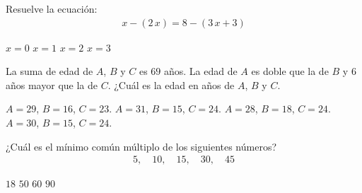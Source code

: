\documentclass[12pt]{exam}
\begin{document}
\begin{multicols}{2}
\begin{questions}
\begin{choices}
    \end{choices}
    \question Resuelve la ecuación:
    \begingroup
    \abovedisplayskip=0pt
    \belowdisplayskip=-10pt
    \begin{align*}
    x - ( 2 \, x) = 8 - (3 \, x + 3)
    \end{align*}
    \endgroup
    \begin{choices}
        \choice $x = 0$
        \choice $x = 1$
        \choice $x = 2$
        \choice $x = 3$
    \end{choices}
    \question La suma de edad de $A$, $B$ y $C$ es $69$ años. La edad de $A$ es doble que la de $B$ y $6$ años mayor que la de $C$. ¿Cuál es la edad en años de $A$, $B$ y $C$.
    \begin{choices}
        \choice $A = 29$, $B = 16$, $C = 23$.
        \choice $A = 31$, $B = 15$, $C = 24$.
        \choice $A = 28$, $B = 18$, $C = 24$.
        \choice $A = 30$, $B = 15$, $C = 24$.
    \end{choices}
    \question ¿Cuál es el mínimo común múltiplo de los siguientes números?
    \begingroup
    \abovedisplayskip=0pt
    \belowdisplayskip=-10pt
    \begin{align*}
    5, \quad 10, \quad 15, \quad 30, \quad 45
    \end{align*}
    \begin{choices}
        \choice $18$
        \choice $50$
        \choice $60$
        \choice $90$
    \end{choices}
\end{questions}

\end{multicols}
\end{document}
